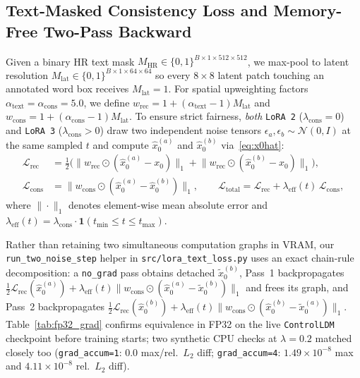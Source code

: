 \documentclass[11pt]{article}
\begin{document}
\subsection{Text-Masked Consistency Loss and Memory-Free Two-Pass Backward}
Given a binary HR text mask $M_{\text{HR}} \in \{0, 1\}^{B\times 1\times 512\times 512}$, we max-pool to latent resolution $M_{\text{lat}} \in \{0, 1\}^{B\times 1\times 64\times 64}$ so every $8\times 8$ latent patch touching an annotated word box receives $M_{\text{lat}}=1$. For spatial upweighting factors $\alpha_{\text{text}} = \alpha_{\text{cons}} = 5.0$, we define $w_{\text{rec}} = 1 + (\alpha_{\text{text}} - 1)M_{\text{lat}}$ and $w_{\text{cons}} = 1 + (\alpha_{\text{cons}} - 1)M_{\text{lat}}$. To ensure strict fairness, \emph{both} \texttt{LoRA~2} ($\lambda_{\text{cons}} = 0$) and \texttt{LoRA~3} ($\lambda_{\text{cons}} > 0$) draw two independent noise tensors $\epsilon_a, \epsilon_b \sim \mathcal{N}(0, I)$ at the same sampled $t$ and compute $\hat{x}_0^{(a)}$ and $\hat{x}_0^{(b)}$ via~\eqref{eq:x0hat}:
\begin{align}
\mathcal{L}_{\text{rec}} &= \frac{1}{2}\Big(\big\|w_{\text{rec}} \odot (\hat{x}_0^{(a)} - x_0)\big\|_1 + \big\|w_{\text{rec}} \odot (\hat{x}_0^{(b)} - x_0)\big\|_1\Big), \\
\mathcal{L}_{\text{cons}} &= \big\|w_{\text{cons}} \odot (\hat{x}_0^{(a)} - \hat{x}_0^{(b)})\big\|_1, \qquad
\mathcal{L}_{\text{total}} = \mathcal{L}_{\text{rec}} + \lambda_{\text{eff}}(t)\,\mathcal{L}_{\text{cons}},
\end{align}
where $\|\cdot\|_1$ denotes element-wise mean absolute error and $\lambda_{\text{eff}}(t) = \lambda_{\text{cons}} \cdot \mathbf{1}(t_{\min} \le t \le t_{\max})$.

Rather than retaining two simultaneous computation graphs in VRAM, our \texttt{run\_two\_noise\_step} helper in \texttt{src/lora\_text\_loss.py} uses an exact chain-rule decomposition: a \texttt{no\_grad} pass obtains detached $\tilde{x}_0^{(b)}$, Pass~1 backpropagates $\frac{1}{2}\mathcal{L}_{\text{rec}}(\hat{x}_0^{(a)}) + \lambda_{\text{eff}}(t)\big\|w_{\text{cons}}\odot(\hat{x}_0^{(a)} - \tilde{x}_0^{(b)})\big\|_1$ and frees its graph, and Pass~2 backpropagates $\frac{1}{2}\mathcal{L}_{\text{rec}}(\hat{x}_0^{(b)}) + \lambda_{\text{eff}}(t)\big\|w_{\text{cons}}\odot(\hat{x}_0^{(b)} - \tilde{x}_0^{(a)})\big\|_1$. Table~\ref{tab:fp32_grad} confirms equivalence in FP32 on the live \texttt{ControlLDM} checkpoint before training starts; two synthetic CPU checks at $\lambda=0.2$ matched closely too (\texttt{grad\_accum=1}: $0.0$ max/rel.\ $L_2$ diff; \texttt{grad\_accum=4}: $1.49\times 10^{-8}$ max and $4.11\times 10^{-8}$ rel.\ $L_2$ diff).
\end{document}
